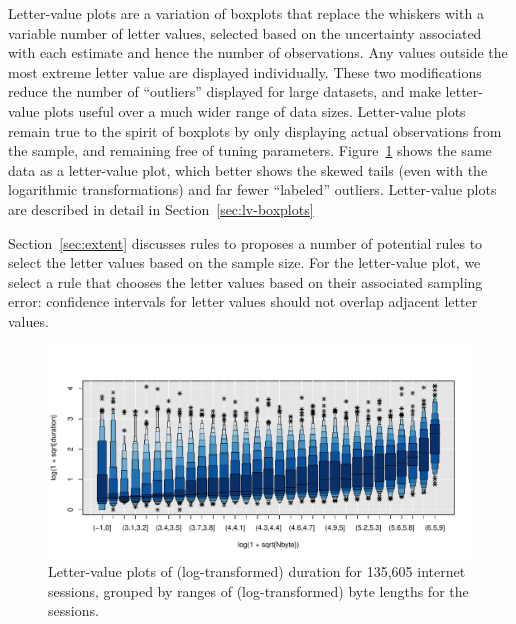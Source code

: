\documentclass[oneside]{article}
\begin{document}
Letter-value plots are a variation of boxplots that replace the whiskers with a variable number of letter values, selected based on the uncertainty associated with each estimate and hence the number of observations. Any values outside the most extreme letter value are displayed individually. These two modifications reduce the number of ``outliers'' displayed for large datasets, and make letter-value plots useful over a much wider range of data sizes. Letter-value plots remain true to the spirit of boxplots by only displaying actual observations from the sample, and remaining free of tuning parameters. Figure~\ref{fig:internet-lbp} shows the same data as a letter-value plot, which better shows the skewed tails (even with the logarithmic transformations) and far fewer ``labeled'' outliers. Letter-value plots are described in detail in Section~\ref{sec:lv-boxplots}

Section~\ref{sec:extent} discusses rules to proposes a number of potential rules to select the letter values based on the sample size. For the letter-value plot, we select a rule that chooses the letter values based on their associated sampling error: confidence intervals for letter values should not overlap adjacent letter values.

\begin{figure}[hbtp]
  \centering
  \includegraphics[width=\linewidth]{lvbox2}

  \caption{Letter-value plots of (log-transformed) duration for 135,605
  internet sessions, grouped by ranges of (log-transformed) byte lengths for
  the sessions.}

  \label{fig:internet-lbp} 
\end{figure}

\end{document}
